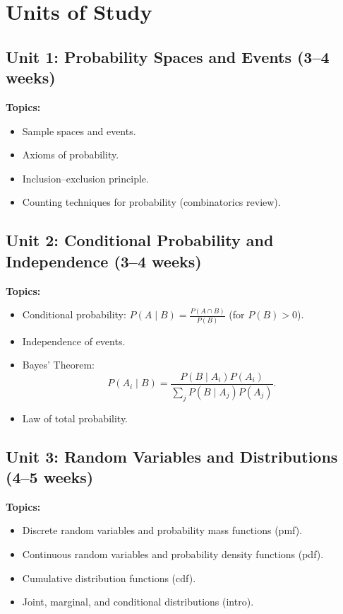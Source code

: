 \documentclass[12pt,oneside]{book}
\begin{document}
\section{Units of Study}

\subsection{Unit 1: Probability Spaces and Events (3--4 weeks)}

\textbf{Topics:}
\begin{itemize}
    \item Sample spaces and events.
    \item Axioms of probability.
    \item Inclusion–exclusion principle.
    \item Counting techniques for probability (combinatorics review).
\end{itemize}

\subsection{Unit 2: Conditional Probability and Independence (3--4 weeks)}

\textbf{Topics:}
\begin{itemize}
    \item Conditional probability: \(P(A \mid B) = \frac{P(A \cap B)}{P(B)}\) (for \(P(B) > 0\)).
    \item Independence of events.
    \item Bayes’ Theorem:
    \[
        P(A_i \mid B) = \frac{P(B \mid A_i)P(A_i)}{\sum_j P(B \mid A_j)P(A_j)}.
    \]
    \item Law of total probability.
\end{itemize}

\subsection{Unit 3: Random Variables and Distributions (4--5 weeks)}

\textbf{Topics:}
\begin{itemize}
    \item Discrete random variables and probability mass functions (pmf).
    \item Continuous random variables and probability density functions (pdf).
    \item Cumulative distribution functions (cdf).
    \item Joint, marginal, and conditional distributions (intro).
\end{itemize}
\end{document}
